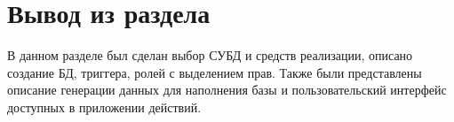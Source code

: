 \section{Вывод из раздела}

В данном разделе был сделан выбор СУБД и средств реализации, описано создание БД, триггера, ролей с выделением прав. Также были представлены описание генерации данных для наполнения базы и пользовательский интерфейс доступных в приложении действий.